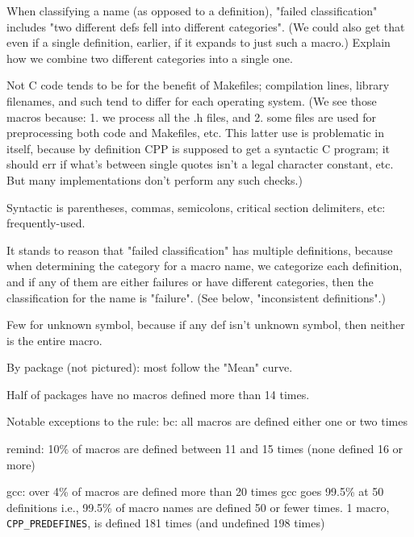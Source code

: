 \documentclass[10pt]{article}
\begin{document}
        When classifying a name (as opposed to a definition), "failed
          classification" includes "two different defs fell into different
          categories".  (We could also get that even if a single
          definition, earlier, if it expands to just such a macro.)
          Explain how we combine two different categories into a single one.

        Not C code tends to be for the benefit of Makefiles; compilation
          lines, library filenames, and such tend to differ for each
          operating system.  (We see those macros because: 1. we process
          all the .h files, and 2. some files are used for preprocessing
          both code and Makefiles, etc.  This latter use is problematic in
          itself, because by definition CPP is supposed to get a syntactic
          C program; it should err if what's between single quotes isn't a
          legal character constant, etc.  But many implementations don't
          perform any such checks.)

        Syntactic is parentheses, commas, semicolons, critical section
          delimiters, etc:  frequently-used.

        It stands to reason that "failed classification" has multiple
          definitions, because when determining the category for a macro
          name, we categorize each definition, and if any of them are
          either failures or have different categories, then the classification
          for the name is "failure".  (See below, "inconsistent definitions".)

        Few for unknown symbol, because if any def isn't unknown symbol,
          then neither is the entire macro.

        By package (not pictured):  most follow the "Mean" curve.

          Half of packages have no macros defined more than 14 times.

          Notable exceptions to the rule:
            bc:  all macros are defined either one or two times

            remind:  10\% of macros are defined between 11 and 15 times
                (none defined 16 or more)

            gcc: over 4\% of macros are defined more than 20 times
                gcc goes 99.5\% at 50 definitions
                i.e., 99.5\% of macro names are defined 50 or fewer times.
                1 macro, \verb|CPP_PREDEFINES|, is defined 181 times (and undefined
                  198 times)
\end{document}
